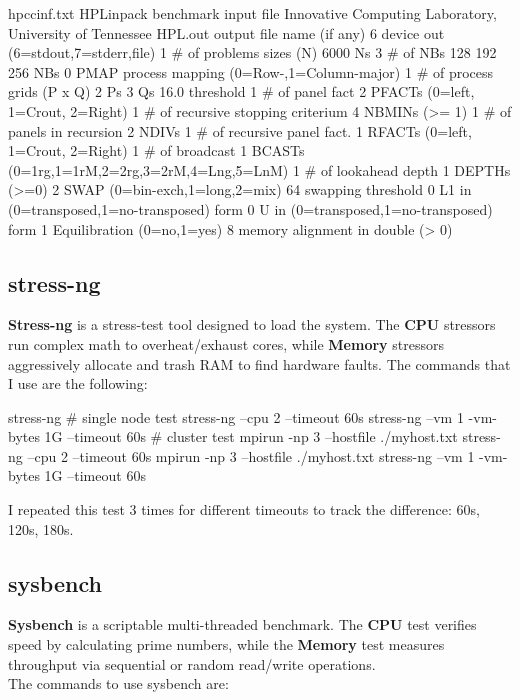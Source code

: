 \begin{codice}[]{hpccinf.txt}
    HPLinpack benchmark input file
    Innovative Computing Laboratory, University of Tennessee
    HPL.out      output file name (if any)
    6            device out (6=stdout,7=stderr,file)
    1            # of problems sizes (N)
    6000         Ns
    3            # of NBs
    128 192 256  NBs
    0            PMAP process mapping (0=Row-,1=Column-major)
    1            # of process grids (P x Q)
    2            Ps
    3            Qs
    16.0         threshold
    1            # of panel fact
    2            PFACTs (0=left, 1=Crout, 2=Right)
    1            # of recursive stopping criterium
    4            NBMINs (>= 1)
    1            # of panels in recursion
    2            NDIVs
    1            # of recursive panel fact.
    1            RFACTs (0=left, 1=Crout, 2=Right)
    1            # of broadcast
    1            BCASTs (0=1rg,1=1rM,2=2rg,3=2rM,4=Lng,5=LnM)
    1            # of lookahead depth
    1            DEPTHs (>=0)
    2            SWAP (0=bin-exch,1=long,2=mix)
    64           swapping threshold
    0            L1 in (0=transposed,1=no-transposed) form
    0            U  in (0=transposed,1=no-transposed) form
    1            Equilibration (0=no,1=yes)
    8            memory alignment in double (> 0)
\end{codice}

\subsection{stress-ng}
\textbf{Stress-ng} is a stress-test tool designed to load the system. The \textbf{CPU} stressors run complex math to overheat/exhaust cores, while \textbf{Memory} stressors aggressively allocate and trash RAM to find hardware faults.
The commands that I use are the following:

\begin{codice}[style=bashstyle]{stress-ng}
    # single node test
    stress-ng --cpu 2 --timeout 60s
    stress-ng --vm 1 -vm-bytes 1G --timeout 60s
    # cluster test
    mpirun -np 3 --hostfile ./myhost.txt stress-ng --cpu 2 --timeout 60s
    mpirun -np 3 --hostfile ./myhost.txt stress-ng --vm 1 -vm-bytes 1G --timeout 60s
\end{codice}

I repeated this test 3 times for different timeouts to track the difference: 60s, 120s, 180s.

\subsection{sysbench}
\textbf{Sysbench} is a scriptable multi-threaded benchmark. The \textbf{CPU} test verifies speed by calculating prime numbers, while the \textbf{Memory} test measures throughput via sequential or random read/write operations. \\
The commands to use sysbench are:

